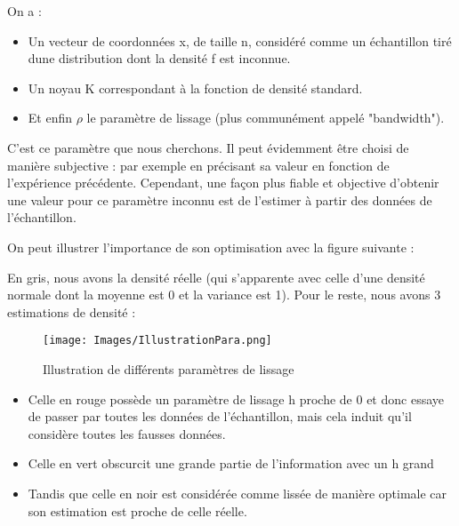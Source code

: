 \documentclass[a4paper,12pt]{article} %
\begin{document}
                 On a :
                 \begin{itemize}
                        \item   Un vecteur de coordonnées x, de taille n, considéré comme un échantillon tiré dune distribution dont la densité f est inconnue.
                        \item 	Un noyau K correspondant à la fonction de densité standard.
                        \item   Et enfin $\rho$ le paramètre de lissage (plus communément appelé "bandwidth").
                \end{itemize}
                
                C'est ce paramètre que nous cherchons. Il peut évidemment être choisi de manière subjective : par exemple en précisant sa valeur en fonction de l'expérience précédente. Cependant, une façon plus fiable et objective d’obtenir une valeur pour ce paramètre inconnu est de l'estimer à partir des données de l'échantillon.
                
                On peut illustrer l'importance de son optimisation avec la figure suivante :
                
                En gris, nous avons la densité réelle (qui s'apparente avec celle d'une densité normale dont la moyenne est 0 et la variance est 1). Pour le reste, nous avons 3 estimations de densité :
                
                \begin{figure}[H]
                \begin{center}
                \texttt{[image: Images/IllustrationPara.png]} 
                \end{center}
                \caption{Illustration de différents paramètres de lissage}
                \label{CasNonfonctionnel}
                \end{figure}
                
                \begin{itemize}
                        \item  Celle en rouge possède un paramètre de lissage h proche de 0 et donc essaye de passer par toutes les données de l'échantillon, mais cela induit qu'il considère toutes les fausses données.
                        \item  Celle en vert obscurcit une grande partie de l'information avec un h grand
                        \item  Tandis que celle en noir est considérée comme lissée de manière optimale car son estimation est proche de celle réelle.
                \end{itemize}
               
\end{document}
